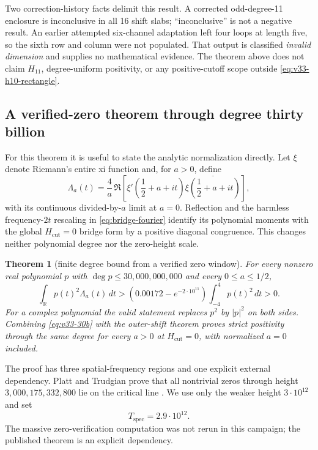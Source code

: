 \documentclass[11pt]{article}
\newtheorem{theorem}{Theorem}[section]
\theoremstyle{definition}
\theoremstyle{remark}
\begin{document}
Two correction-history facts delimit this result.  A corrected odd-degree-11
enclosure is inconclusive in all 16 shift slabs; ``inconclusive'' is not a
negative result.  An earlier attempted six-channel adaptation left four loops
at length five, so the sixth row and column were not populated.  That output is
classified \emph{invalid dimension} and supplies no mathematical evidence.
The theorem above does not claim $H_{11}$, degree-uniform positivity, or any
positive-cutoff scope outside \eqref{eq:v33-h10-rectangle}.

\subsection{A verified-zero theorem through degree thirty billion}

For this theorem it is useful to state the analytic normalization directly.
Let $\xi$ denote Riemann's entire xi function and, for $a>0$, define
\begin{equation}
 \Lambda_a(t)=\frac4a\,
 \Re\!\left[
   \xi'\!\left(\frac12+a+it\right)
   \overline{\xi\!\left(\frac12+a+it\right)}
 \right],
 \label{eq:v33-lambda}
\end{equation}
with its continuous divided-by-$a$ limit at $a=0$.  Reflection and the harmless
frequency-$2t$ rescaling in \eqref{eq:bridge-fourier} identify its polynomial
moments with the global $H_{\mathrm{cut}}=0$ bridge form by a positive diagonal
congruence.  This changes neither polynomial degree nor the zero-height scale.

\begin{theorem}[finite degree bound from a verified zero window]
For every nonzero real polynomial $p$ with
$\deg p\le30{,}000{,}000{,}000$ and every $0\le a\le1/2$,
\begin{equation}
 \int_{\mathbb R}p(t)^2\Lambda_a(t)\,dt
 >\left(0.00172-e^{-2\cdot10^{11}}\right)
   \int_{-4}^{4}p(t)^2\,dt>0.
 \label{eq:v33-30b}
\end{equation}
For a complex polynomial the valid statement replaces $p^2$ by $|p|^2$ on
both sides.  Combining \eqref{eq:v33-30b} with the outer-shift theorem proves
strict positivity through the same degree for every $a>0$ at
$H_{\mathrm{cut}}=0$, with normalized $a=0$ included.
\end{theorem}

The proof has three spatial-frequency regions and one explicit external
dependency.  Platt and Trudgian prove that all nontrivial zeros through height
$3{,}000{,}175{,}332{,}800$ lie on the critical line
\cite{PlattTrudgian2021}.  We use only the weaker height $3\cdot10^{12}$ and set
\[
 T_{\mathrm{spec}}=2.9\cdot10^{12}.
\]
The massive zero-verification computation was not rerun in this campaign; the
published theorem is an explicit dependency.
\end{document}
